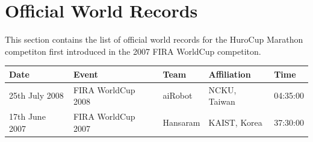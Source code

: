 \documentclass[12pt]{hurocup}
\begin{document}
\section{Official World Records}
\label{sec:worldrecords}

This section contains the list of official world records for the
HuroCup Marathon competiton first introduced in the 2007 FIRA WorldCup
competiton.

\begin{center}
\begin{tabular}{|lllll|}
\hline
Date & Event & Team & Affiliation & Time \\
\hline
25th July 2008 & FIRA WorldCup 2008 & aiRobot & NCKU, Taiwan & 04:35:00 \\
17th June 2007 & FIRA WorldCup 2007 & Hansaram & KAIST, Korea & 37:30:00 \\
\hline
\end{tabular}
\end{center}
\end{document}
